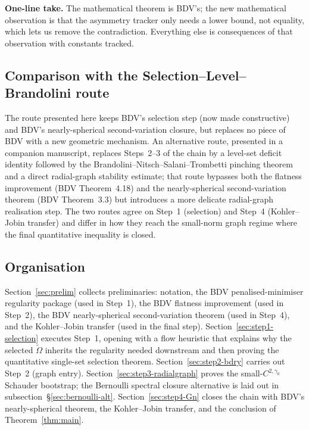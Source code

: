 \documentclass[11pt]{amsart}
\theoremstyle{definition}
\begin{document}
\smallskip
\noindent\textbf{One-line take.}  The mathematical theorem is BDV's;
the new mathematical observation is that the asymmetry tracker only
needs a lower bound, not equality, which lets us remove the
contradiction.  Everything else is consequences of that observation
with constants tracked.

\subsection*{Comparison with the Selection--Level--Brandolini route}

The route presented here keeps BDV's selection step (now made
constructive) and BDV's nearly-spherical second-variation closure,
but replaces no piece of BDV with a new geometric mechanism.  An
alternative route, presented in a companion manuscript, replaces
Steps~2--3 of the chain by a level-set deficit identity followed by
the Brandolini--Nitsch--Salani--Trombetti pinching theorem and a
direct radial-graph stability estimate; that route bypasses both the
flatness improvement (BDV Theorem~4.18) and the nearly-spherical
second-variation theorem (BDV Theorem~3.3) but introduces a more
delicate radial-graph realisation step.  The two routes agree on
Step~1 (selection) and Step~4 (Kohler--Jobin transfer) and differ in
how they reach the small-norm graph regime where the final
quantitative inequality is closed.

\subsection*{Organisation}

Section~\ref{sec:prelim} collects preliminaries: notation, the BDV
penalised-minimiser regularity package (used in Step~1), the BDV
flatness improvement (used in Step~2), the BDV nearly-spherical
second-variation theorem (used in Step~4), and the Kohler--Jobin
transfer (used in the final step).
Section~\ref{sec:step1-selection} executes Step~1, opening with a
flow heuristic that explains why the selected $\widetilde\Omega$
inherits the regularity needed downstream and then proving the
quantitative single-set selection theorem.
Section~\ref{sec:step2-bdry} carries out Step~2 (graph entry).
Section~\ref{sec:step3-radialgraph} proves the small-$C^{2,\gamma_0}$
Schauder bootstrap; the Bernoulli spectral closure alternative is
laid out in subsection~\S\ref{sec:bernoulli-alt}.
Section~\ref{sec:step4-Gn} closes the chain with BDV's
nearly-spherical theorem, the Kohler--Jobin transfer, and the
conclusion of Theorem~\ref{thm:main}.
\end{document}
